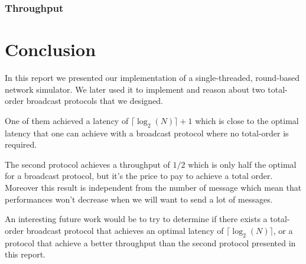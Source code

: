 \documentclass[a4paper]{article}
\begin{document}
\subsubsection*{Throughput}

\section*{Conclusion}
In this report we presented our implementation of a single-threaded,
round-based network simulator. We later used it to implement and reason about
two total-order broadcast protocols that we designed.

One of them achieved a latency of $\lceil\log_2(N)\rceil + 1$ which is close
to the optimal latency that one can achieve with a broadcast protocol where no
total-order is required.

The second protocol achieves a throughput of $1/2$ which is only half the
optimal for a broadcast protocol, but it's the price to pay to achieve a total
order. Moreover this result is independent from the number of message which mean
that performances won't decrease when we will want to send a lot of messages.

An interesting future work would be to try to determine if there exists a
total-order broadcast protocol that achieves an optimal latency of
$\lceil\log_2(N)\rceil$, or a protocol that achieve a better throughput than
the second protocol presented in this report.
\end{document}
